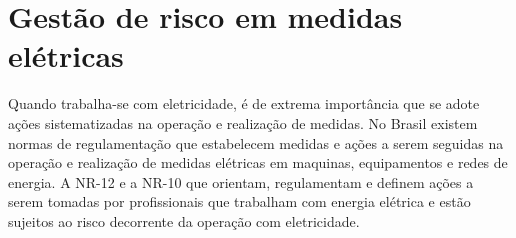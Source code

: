 \documentclass[
	article,			%
	11pt,				%
	oneside,			%
	a4paper,			%
	english,			%
	brazil,				%
	sumario=tradicional
	]{abntex2}
\begin{document}

%
%
%
%
\section{Gestão de risco em medidas elétricas}
Quando trabalha-se com eletricidade, é de extrema importância que se adote ações sistematizadas na operação e realização de medidas.%
No Brasil existem normas de regulamentação que estabelecem medidas e ações a serem seguidas na operação e realização de medidas elétricas em maquinas, equipamentos e redes de energia. A NR-12 %
e a NR-10 que orientam, regulamentam e definem ações a serem tomadas por profissionais que trabalham com energia elétrica e estão sujeitos ao risco decorrente da operação com eletricidade.
\end{document}
